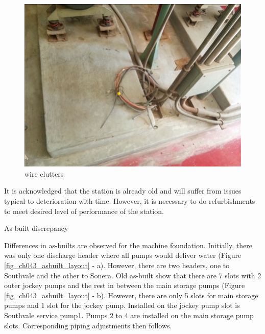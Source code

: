 \begin{figure}[!htb]
\begin{minipage}[b]{0.3\linewidth}
		\includegraphics[width=\textwidth]{figures/fig_ch043_wireclutters}
		\caption{wire clutters}
		\label{fig_ch043_wireclutters}
	\end{minipage}
\end{figure}



It is acknowledged that the station is already old and will suffer from issues typical to deterioration with time. However, it is necessary to do refurbishments to meet desired level of performance of the station.

As built discrepancy

Differences in as-builts are observed for the machine foundation. Initially, there was only one discharge header where all pumps would deliver water (Figure \ref{fig_ch043_asbuilt_layout} - a). However, there are two headers, one to Southvale and the other to Sonera. Old as-built show that there are 7 slots with 2 outer jockey pumps and the rest in between the main storage pumps (Figure \ref{fig_ch043_asbuilt_layout} - b). However, there are only 5 slots for main storage pumps and 1 slot for the jockey pump. Installed on the jockey pump slot is Southvale service pump1. Pumps 2 to 4 are installed on the main storage pump slots. Corresponding piping adjustments then follows.

